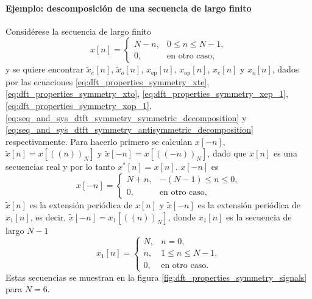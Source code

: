 \documentclass[a4paper]{report}
\begin{document}
\paragraph{Ejemplo: descomposición de una secuencia de largo finito} Considérese la secuencia de largo finito
\begin{equation}\label{eq:dft_properties_symmetry_example_xn}
 x[n]=
 \left\{ 
 \begin{array}{ll}
  N-n, &0\leq n\leq N-1,\\
  0, & \textrm{en otro caso,}
 \end{array}
 \right. 
\end{equation}
y se quiere encontrar \(\tilde{x}_e[n]\), \(\tilde{x}_o[n]\), \(x_\textrm{ep}[n]\), \(x_\textrm{op}[n]\), \(x_e[n]\) y \(x_o[n]\), dados por las ecuaciones \ref{eq:dft_properties_symmetry_xte}, \ref{eq:dft_properties_symmetry_xto}, \ref{eq:dft_properties_symmetry_xep_1}, \ref{eq:dft_properties_symmetry_xop_1}, \ref{eq:seq_and_sys_dtft_symmetry_symmetric_decomposition} y \ref{eq:seq_and_sys_dtft_symmetry_antisymmetric_decomposition} respectivamente. Para hacerlo primero se calculan \(x[-n]\), \(\tilde{x}[n]=x[((n))_N]\) y \(\tilde{x}[-n]=x[((-n))_N]\), dado que \(x[n]\) es una secuencias real y por lo tanto \(x^*[n]=x[n]\). \(x[-n]\) es
\[
 x[-n]=
 \left\{ 
 \begin{array}{ll}
  N+n, &-(N-1)\leq n\leq 0,\\
  0, & \textrm{en otro caso,}
 \end{array}
 \right.
\]
\(\tilde{x}[n]\) es la extensión periódica de \(x[n]\) y \(\tilde{x}[-n]\) es la extensión periódica de \(x_1[n]\), es decir, \(\tilde{x}[-n]=x_1[((n))_N]\), donde \(x_1[n]\) es la secuencia de largo \(N-1\)
\begin{equation}\label{eq:dft_properties_symmetry_example_x1}
 x_1[n]=
 \left\{ 
 \begin{array}{ll}
  N, & n=0,\\
  n, & 1\leq n\leq N-1,\\
  0, & \textrm{en otro caso.}
 \end{array}
 \right. 
\end{equation}
Estas secuencias se muestran en la figura \ref{fig:dft_properties_symmetry_signals} para \(N=6\). 
\end{document}
